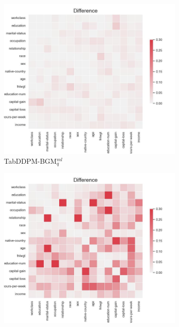 \begin{figure}[h]
	\begin{subfigure}{0.3\textwidth}
		\includegraphics[width=\textwidth]{images/correlation_difference/tab-ddpm-bgm.jpg}
		\caption{TabDDPM-BGM$^{ml}_q$}
	\end{subfigure}
	\hfill
	\begin{subfigure}{0.3\textwidth}
		\includegraphics[width=\textwidth]{images/correlation_difference/tab-ddpm-ft.jpg}

\end{subfigure}
\end{figure}

